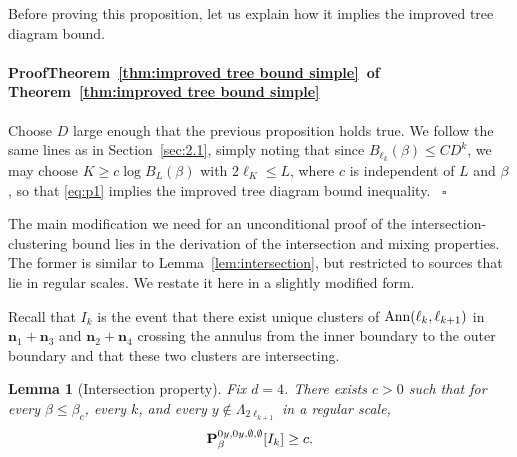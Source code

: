 \documentclass[a4paper,oneside,11pt]{article}
\newtheorem{lemma}[theorem]{Lemma}
\newcommand{\be}[1]{\begin{equation}\label{#1}}
\newcommand{\ee}{\end{equation}}
\numberwithin{equation}{section}
\numberwithin{equation}{section}
\numberwithin{equation}{section}
\newenvironment{proof}[1][\relax]%
  {\paragraph{Proof\ifx#1\relax\else~of #1\fi}}%
  {~\hfill$\square$\par\bigskip}
\def\be{\begin{equation}}
\def\ee{\end{equation}}
\newcommand{\n}{\mathbf{n}}
\begin{document}
Before proving this proposition, let us explain how it implies the improved tree diagram bound.
\begin{proof}[Theorem~\ref{thm:improved tree bound simple}]
Choose $D$ large enough that the previous proposition holds true. We follow the same lines as in Section~\ref{sec:2.1}, simply noting that since $B_{\ell_k}(\beta) \le  CD^k$, we may choose $K\ge c\log B_L(\beta)$ with $2\ell_{K}\le L$, where $c$ is independent of $L$ and $\beta$, so that \eqref{eq:p1} implies the improved tree diagram bound inequality. 
\end{proof}


The main modification we need for an unconditional proof of the intersection-clustering bound 
lies in  the derivation of the intersection and mixing properties. 
The former is similar to Lemma~\ref{lem:intersection}, but restricted to sources that lie in regular scales.  We restate it here in a slightly modified form.

Recall that $I_k$ 
is the event  that there exist unique clusters of ${\rm Ann}(\ell_{k},\ell_{k+1})$ in $\n_1+\n_3$ and $\n_2+\n_4$ crossing the annulus from the inner boundary to the outer boundary and that these two clusters are intersecting.
\begin{lemma}[Intersection property]\label{lem:intersection general}
Fix $d=4$. 
There exists $c>0$ such that for every $\beta\le\beta_c$, every $k$, and every $y\notin \Lambda_{2\ell_{k+1}}$ in a regular scale,
\be
{\bf P}^{0y,0y,\emptyset,\emptyset}_\beta[I_k]\ge c.
\ee
\end{lemma}
\end{document}
